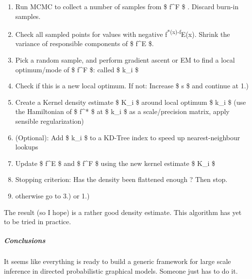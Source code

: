 \begin{enumerate}[1.]
\item
  Run MCMC to collect a number of samples from \$ f\^{}F \$ . Discard
  burn-in samples.
\item
  Check all sampled points for values with negative
  f\textsuperscript{*(x)-f}E(x). Shrink the variance of responsible
  components of \$ f\^{}E \$.
\item
  Pick a random sample, and perform gradient ascent or EM to find a
  local optimum/mode of \$ f\^{}F \$: called \$ k\_i \$
\item
  Check if this is a new local optimum. If not: Increase \$ s \$ and
  continue at 1.)
\item
  Create a Kernel density estimate \$ K\_i \$ around local optimum \$
  k\_i \$ (use the Hamiltonian of \$ f\^{}* \$ at \$ k\_i \$ as a
  scale/precision matrix, apply sensible regularization)
\item
  (Optional): Add \$ k\_i \$ to a KD-Tree index to speed up
  nearest-neighbour lookups
\item
  Update \$ f\^{}E \$ and \$ f\^{}F \$ using the new kernel estimate \$
  K\_i \$
\item
  Stopping criterion: Has the density been flattened enough ? Then stop.
\item
  otherwise go to 3.) or 1.)
\end{enumerate}
The result (so I hope) is a rather good density estimate. This algorithm
has yet to be tried in practice.

\subparagraph{Conclusions}

It seems like everything is ready to build a generic framework for large
scale inference in directed probabilistic graphical models. Someone just
has to do it.
